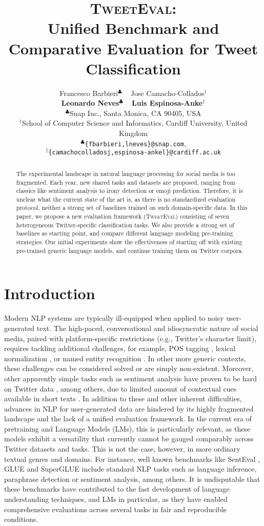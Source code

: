 \documentclass[11pt,a4paper]{article}
\title{\textsc{TweetEval}: \\ Unified Benchmark and Comparative Evaluation for Tweet Classification}
\author{
 Francesco Barbieri$^{\clubsuit}$ ~ Jose Camacho-Collados$^{\dagger}$ \\
 \textbf{Leonardo Neves}$^{\clubsuit}$ ~ \textbf{Luis Espinosa-Anke}$^{\dagger}$  \vspace{0.1cm} \\
$^\clubsuit$Snap Inc., Santa Monica, CA 90405, USA\\
$^\dagger$School of Computer Science and Informatics, Cardiff University, United Kingdom \vspace{0.1cm} \\
{ \tt $^{\clubsuit}$\{fbarbieri,lneves\}@snap.com},\\
{  \tt $^{\dagger}$\{camachocolladosj,espinosa-ankel\}@cardiff.ac.uk}\\ 
}
\date{}
\begin{document}
\maketitle
\begin{abstract}

The experimental landscape in natural language processing for social media is too fragmented. Each year, new shared tasks and datasets are proposed, ranging from classics like sentiment analysis to irony detection or emoji prediction. 
Therefore, it is unclear what the current state of the art is, as there is no standardized evaluation protocol, neither a strong set of baselines trained on such domain-specific data. In this paper,
we propose a new evaluation framework (\textsc{TweetEval}) consisting of seven heterogeneous Twitter-specific classification tasks. We also provide a strong set of baselines as starting point, and compare different language modeling pre-training strategies. Our initial experiments show the effectiveness of starting off with existing pre-trained generic language models, and continue training them on Twitter corpora. 

\end{abstract}




\section{Introduction}

Modern NLP systems are typically ill-equipped when applied to noisy user-generated text. The high-paced, conversational and idiosyncratic nature of social media, paired with platform-specific restrictions (e.g., Twitter's character limit), requires tackling additional challenges, for example, POS tagging \cite{derczynski-etal-2013-twitter}, lexical normalization \cite{han2011lexical,baldwin2015shared}, or named entity recognition \cite{ritter2011named,baldwin-etal-2013-noisy}. In other more generic contexts, these challenges can be considered solved or are simply non-existent. Moreover, other apparently simple tasks such as sentiment analysis have proven to be hard on Twitter data \cite{poria2020beneath}, among others, due to limited amount of contextual cues available in short texts \cite{kim2014sociolinguistic}.
In addition to these and other inherent difficulties, advances in NLP for user-generated data are hindered by its highly fragmented landscape and the lack of a unified evaluation framework. In the current era of pretraining and Language Models (LMs), this is particularly relevant, as these models exhibit a versatility that currently cannot be gauged comparably across Twitter datasets and tasks. This is not the case, however, in more ordinary textual genres and domains. For instance, well known benchmarks like SentEval \cite{conneau-kiela-2018-senteval}, GLUE \cite{wang2019glue} and SuperGLUE \cite{wang2019superglue} include standard NLP tasks such as language inference, paraphrase detection or sentiment analysis, among others. It is undisputable that these benchmarks have contributed to the fast development of language understanding techniques, and LMs in particular, as they have enabled comprehensive evaluations across several tasks in fair and reproducible conditions.
\end{document}
